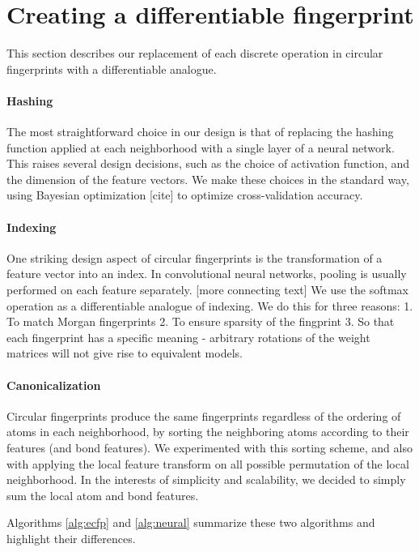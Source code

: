 \documentclass{article}
\begin{document}
\section{Creating a differentiable fingerprint}
This section describes our replacement of each discrete operation in circular fingerprints with a differentiable analogue.

\paragraph{Hashing}
The most straightforward choice in our design is that of replacing the hashing function applied at each neighborhood with a single layer of a neural network.
This raises several design decisions, such as the choice of activation function, and the dimension of the feature vectors.
We make these choices in the standard way, using Bayesian optimization [cite] to optimize cross-validation accuracy.

\paragraph{Indexing}
One striking design aspect of circular fingerprints is the transformation of a feature vector into an index.
In convolutional neural networks, pooling is usually performed on each feature separately.
[more connecting text]
We use the softmax operation as a differentiable analogue of indexing.
We do this for three reasons: 1. To match Morgan fingerprints 2. To ensure sparsity of the fingprint 3. So that each fingerprint has a specific meaning - arbitrary rotations of the weight matrices will not give rise to equivalent models.

\paragraph{Canonicalization}
Circular fingerprints produce the same fingerprints regardless of the ordering of atoms in each neighborhood, by sorting the neighboring atoms according to their features (and bond features).
We experimented with this sorting scheme, and also with applying the local feature transform on all possible permutation of the local neighborhood.
In the interests of simplicity and scalability, we decided to simply sum the local atom and bond features.

Algorithms \ref{alg:ecfp} and \ref{alg:neural} summarize these two algorithms and highlight their differences.
\end{document}
